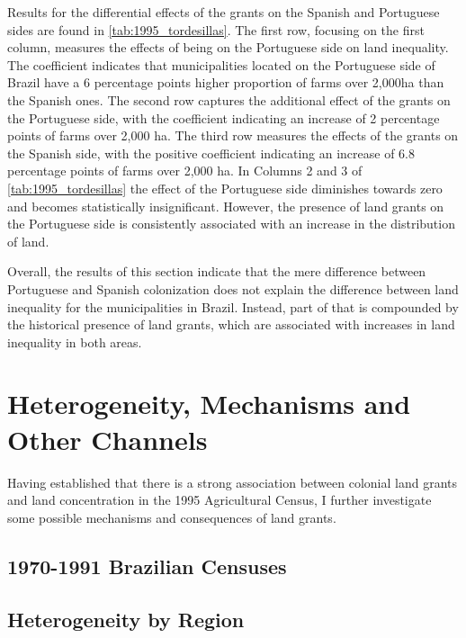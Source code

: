 \documentclass[11pt]{article}
\begin{document}
Results for the differential effects of the grants on the Spanish and Portuguese sides are found in \autoref{tab:1995_tordesillas}.
The first row, focusing on the first column, measures the effects of being on the Portuguese side on land inequality. 
The coefficient indicates that municipalities located on the Portuguese side of Brazil have a 6 percentage points higher proportion of farms over 2,000ha than the Spanish ones.
The second row captures the additional effect of the grants on the Portuguese side, with the coefficient indicating an increase of 2 percentage points of farms over 2,000 ha.
The third row measures the effects of the grants on the Spanish side, with the positive coefficient indicating an increase of 6.8 percentage points of farms over 2,000 ha. 
In Columns 2 and 3 of \autoref{tab:1995_tordesillas} the effect of the Portuguese side diminishes towards zero and becomes statistically insignificant. 
However, the presence of land grants on the Portuguese side is consistently associated with an increase in the distribution of land.

Overall, the results of this section indicate that the mere difference between Portuguese and Spanish colonization does not explain the difference between land inequality for the municipalities in Brazil.
Instead, part of that is compounded by the historical presence of land grants, which are associated with increases in land inequality in both areas.

\section{Heterogeneity, Mechanisms and Other Channels}
\label{sec:mechanisms}

Having established that there is a strong association between colonial land grants and land concentration in the 1995 Agricultural Census, I further investigate some possible mechanisms and consequences of land grants. 

\subsection{1970-1991 Brazilian Censuses}

\subsection{Heterogeneity by Region}
\end{document}
